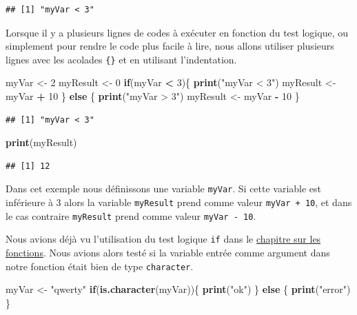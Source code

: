 \documentclass[]{book}
\newenvironment{Shaded}{\begin{snugshade}}{\end{snugshade}}
\newcommand{\ControlFlowTok}[1]{\textcolor[rgb]{0.13,0.29,0.53}{\textbf{#1}}}
\newcommand{\DecValTok}[1]{\textcolor[rgb]{0.00,0.00,0.81}{#1}}
\newcommand{\KeywordTok}[1]{\textcolor[rgb]{0.13,0.29,0.53}{\textbf{#1}}}
\newcommand{\NormalTok}[1]{#1}
\newcommand{\OperatorTok}[1]{\textcolor[rgb]{0.81,0.36,0.00}{\textbf{#1}}}
\newcommand{\StringTok}[1]{\textcolor[rgb]{0.31,0.60,0.02}{#1}}
\begin{document}
\begin{verbatim}
## [1] "myVar < 3"
\end{verbatim}

Lorsque il y a plusieurs lignes de codes à exécuter en fonction du test logique, ou simplement pour rendre le code plus facile à lire, nous allons utiliser plusieurs lignes avec les acolades \texttt{\{\}} et en utilisant l'indentation.

\begin{Shaded}
\begin{Highlighting}[]
\NormalTok{myVar <-}\StringTok{ }\DecValTok{2}
\NormalTok{myResult <-}\StringTok{ }\DecValTok{0}
\ControlFlowTok{if}\NormalTok{(myVar }\OperatorTok{<}\StringTok{ }\DecValTok{3}\NormalTok{)\{}
  \KeywordTok{print}\NormalTok{(}\StringTok{"myVar < 3"}\NormalTok{)}
\NormalTok{  myResult <-}\StringTok{ }\NormalTok{myVar }\OperatorTok{+}\StringTok{ }\DecValTok{10}
\NormalTok{\} }\ControlFlowTok{else}\NormalTok{ \{}
  \KeywordTok{print}\NormalTok{(}\StringTok{"myVar > 3"}\NormalTok{)}
\NormalTok{  myResult <-}\StringTok{ }\NormalTok{myVar }\OperatorTok{-}\StringTok{ }\DecValTok{10}
\NormalTok{\}}
\end{Highlighting}
\end{Shaded}

\begin{verbatim}
## [1] "myVar < 3"
\end{verbatim}

\begin{Shaded}
\begin{Highlighting}[]
\KeywordTok{print}\NormalTok{(myResult)}
\end{Highlighting}
\end{Shaded}

\begin{verbatim}
## [1] 12
\end{verbatim}

Dans cet exemple nous définissons une variable \texttt{myVar}. Si cette variable est inférieure à 3 alors la variable \texttt{myResult} prend comme valeur \texttt{myVar\ +\ 10}, et dans le cas contraire \texttt{myResult} prend comme valeur \texttt{myVar\ -\ 10}.

Nous avions déjà vu l'utilisation du test logique \texttt{if} dans le \protect\hyperlink{l015function}{chapitre sur les fonctions}. Nous avions alors testé si la variable entrée comme argument dans notre fonction était bien de type \texttt{character}.

\begin{Shaded}
\begin{Highlighting}[]
\NormalTok{myVar <-}\StringTok{ "qwerty"}
\ControlFlowTok{if}\NormalTok{(}\KeywordTok{is.character}\NormalTok{(myVar))\{}
  \KeywordTok{print}\NormalTok{(}\StringTok{"ok"}\NormalTok{)}
\NormalTok{\} }\ControlFlowTok{else}\NormalTok{ \{}
  \KeywordTok{print}\NormalTok{(}\StringTok{"error"}\NormalTok{)}
\NormalTok{\}}
\end{Highlighting}
\end{Shaded}
\end{document}
